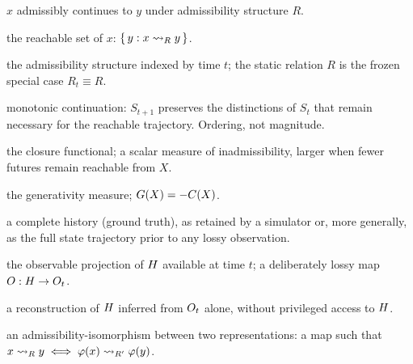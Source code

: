 \documentclass[11pt]{book}
\begin{document}
\begin{description}[leftmargin=2.2cm, style=nextline]
  \item[$x \adm{R} y$] $x$ admissibly continues to $y$ under admissibility
    structure $R$.
  \item[$\reach{x}$] the reachable set of $x$: $\{\, y : x \rightsquigarrow_{R} y \,\}$.
  \item[$R_t$] the admissibility structure indexed by time $t$; the
    static relation $R$ is the frozen special case $R_t \equiv R$.
  \item[$S_t \le S_{t+1}$] monotonic continuation: $S_{t+1}$ preserves
    the distinctions of $S_t$ that remain necessary for the reachable
    trajectory. Ordering, not magnitude.
  \item[$\closure{X} = -\log \mu(\reach{X})$] the closure functional; a
    scalar measure of inadmissibility, larger when fewer futures remain
    reachable from $X$.
  \item[$\genmeas{X} = \log \mu(\reach{X})$] the generativity measure;
    $G(X) = -C(X)$.
  \item[$\History$] a complete history (ground truth), as retained by a
    simulator or, more generally, as the full state trajectory prior to
    any lossy observation.
  \item[$\Observable$] the observable projection of $\History$ available
    at time $t$; a deliberately lossy map $O : H \to
    O_t$.
  \item[$\Reconstruction$] a reconstruction of $\History$ inferred from
    $\Observable$ alone, without privileged access to $\History$.
  \item[$\varphi$] an admissibility-isomorphism between two
    representations: a map such that $x \rightsquigarrow_{R} y \iff \varphi(x)
    \rightsquigarrow_{R'} \varphi(y)$.
\end{description}

\mainmatter








\backmatter


\end{document}
